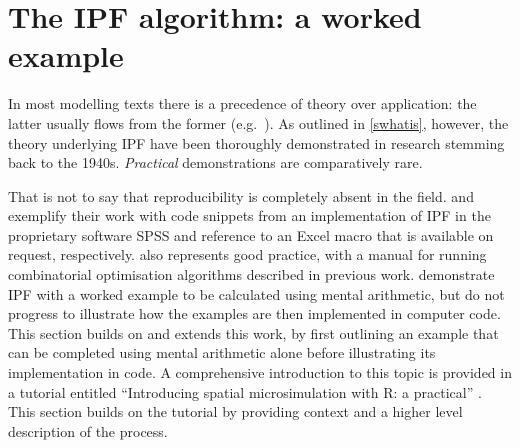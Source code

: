 \documentclass[a4paper,10pt]{article}
\begin{document}
\section{The IPF algorithm: a worked example} \label{s:theory}
In most modelling texts there is a precedence of theory over
application: the latter usually flows from the former
(e.g.~\citealp{batty1976urban}).  
As outlined in \cref{swhatis}, however, the theory underlying IPF have
been thoroughly demonstrated in research stemming back to the 1940s.
\emph{Practical} demonstrations
are comparatively rare.


That is not to say that reproducibility is completely absent in the field.
\citet{Simpson2005} and \citet{Norman1999a}
exemplify their work with code snippets from an implementation
of IPF in the proprietary software SPSS and reference to
an Excel macro that is available on request, respectively.
\citet{Williamson2007} also represents
good practice, with a manual for running 
combinatorial optimisation algorithms described in previous work.
\citet{Ballas2005c} demonstrate IPF with a worked example
to be calculated using mental arithmetic, but do not progress to
illustrate how the examples are then implemented in computer code.
This section builds on and extends this work, by first outlining an example that
can be completed using mental arithmetic alone before illustrating its
implementation in code. A comprehensive introduction to
this topic is provided in a tutorial entitled
 ``Introducing spatial microsimulation with R: a practical'' \citep{lovelace2014introducing}. This section builds on the tutorial by providing
context and a higher level description of the process.


\end{document}
